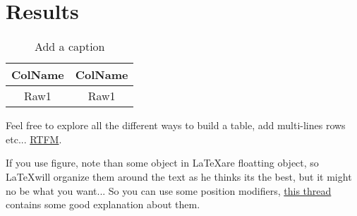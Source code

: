 \section{Results}


\begin{table}[htb]
    \centering
    \begin{tabular}{| c | c |}
    \hline
         ColName & ColName  \\
         \hline
         Raw1 & Raw1 \\
         \hline
    \end{tabular}
    \caption{Add a caption }
    \label{tab:tinytab}
\end{table}
Feel free to explore all the different ways to build a table, add multi-lines rows etc... \href{https://fr.overleaf.com/learn/latex/Tables}{RTFM}.

If you use figure, note than some object in \LaTeX are floatting object, so \LaTeX will organize them around the text as he thinks its the best, but it might no be what you want... So you can use some position modifiers, \href{https://tex.stackexchange.com/questions/16207/image-from-includegraphics-showing-up-in-wrong-location}{this thread} contains some good explanation about them.